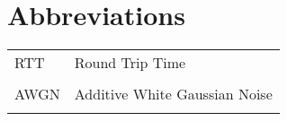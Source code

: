 \section*{Abbreviations}
\label{ch:abbreviations}

{}

\begin{table}[ht!]
    \begin{tabular}{l l}
        RTT & Round Trip Time \\\\
        AWGN & Additive White Gaussian Noise \\\\
    \end{tabular}
\end{table}